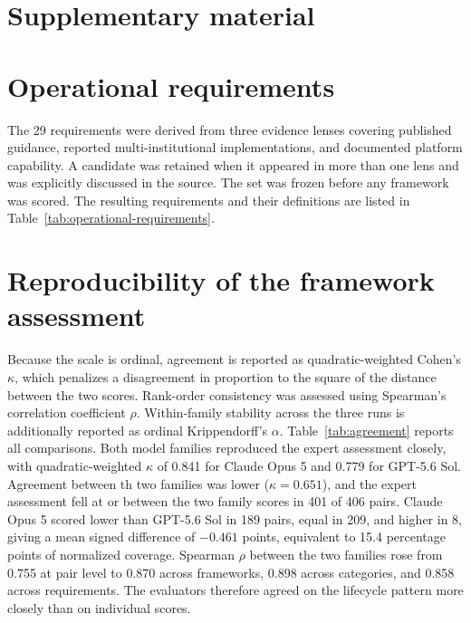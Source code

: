 \clearpage

\appendix
\setcounter{table}{0}
\setcounter{figure}{0}
\renewcommand{\thetable}{A.\arabic{table}}

\section*{Supplementary material}

\section{Operational requirements}

The 29 requirements were derived from three evidence lenses covering published guidance, reported multi-institutional
implementations, and documented platform capability. A candidate was retained when it appeared in more than one lens
and was explicitly discussed in the source. The set was frozen before any framework was scored.
The resulting requirements and their definitions are listed in Table~\ref{tab:operational-requirements}.



\section{Reproducibility of the framework assessment}
\label{app:agreement}

Because the scale is ordinal, agreement is reported as quadratic-weighted Cohen's
$\kappa$, which penalizes a disagreement in proportion to the square of the distance
between the two scores\cite{cohen1968weighted}.
%
Rank-order consistency was assessed using Spearman’s correlation coefficient $\rho$\cite{spearman2010proof}.
%
Within-family stability across the
three runs is additionally reported as ordinal Krippendorff's
$\alpha$\cite{hayes2007answering}.
%
Table~\ref{tab:agreement} reports all comparisons. Both model families
reproduced the expert assessment closely, with quadratic-weighted $\kappa$
of 0.841 for Claude Opus 5 and 0.779 for GPT-5.6 Sol. Agreement between th two families was lower ($\kappa = 0.651$), and the expert assessment fell at or between the two family scores in 401 of 406 pairs. Claude Opus 5 scored lower than GPT-5.6 Sol in 189 pairs, equal in 209, and higher in 8, giving a mean signed difference of $-0.461$ points, equivalent to 15.4 percentage points of normalized coverage. 
Spearman $\rho$ between the two families rose from 0.755 at pair level to 0.870 across frameworks, 0.898 across categories, and 0.858 across requirements. The evaluators therefore agreed on the lifecycle pattern more closely than on individual scores.

